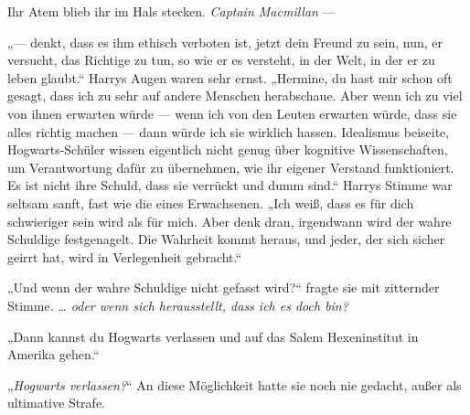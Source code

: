 Ihr Atem blieb ihr im Hals stecken. \emph{Captain Macmillan} —

„— denkt, dass es ihm ethisch verboten ist, jetzt dein Freund zu sein, nun, er versucht, das Richtige zu tun, so wie er es versteht, in der Welt, in der er zu leben glaubt.“
Harrys Augen waren sehr ernst.
„Hermine, du hast mir schon oft gesagt, dass ich zu sehr auf andere Menschen herabschaue. Aber wenn ich zu viel von ihnen erwarten würde — wenn ich von den Leuten erwarten würde, dass sie alles richtig machen — dann würde ich sie wirklich hassen. Idealismus beiseite, Hogwarts-Schüler wissen eigentlich nicht genug über kognitive Wissenschaften, um Verantwortung dafür zu übernehmen, wie ihr eigener Verstand funktioniert. Es ist nicht ihre Schuld, dass sie verrückt und dumm sind.“
Harrys Stimme war seltsam sanft, fast wie die eines Erwachsenen.
„Ich weiß, dass es für dich schwieriger sein wird als für mich. Aber denk dran, irgendwann wird der wahre Schuldige festgenagelt. Die Wahrheit kommt heraus, und jeder, der sich sicher geirrt hat, wird in Verlegenheit gebracht.“


„Und wenn der wahre Schuldige nicht gefasst wird?“ fragte sie mit zitternder Stimme. \emph{… oder wenn sich herausstellt, dass ich es doch bin?}

„Dann kannst du Hogwarts verlassen und auf das Salem Hexeninstitut in Amerika gehen.“

„\emph{Hogwarts verlassen?}“ An diese Möglichkeit hatte sie noch nie gedacht, außer als ultimative Strafe.

